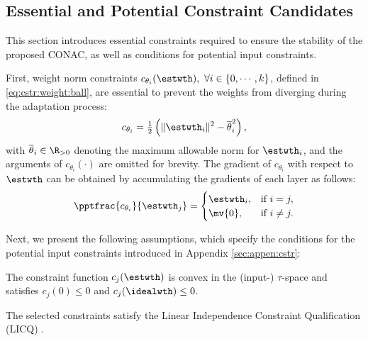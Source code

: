 \documentclass[letterpaper, journal]{IEEEtran}
\begin{document}
\subsection{Essential and Potential Constraint Candidates}\label{sec:sub:cstr} 

This section introduces essential constraints required to ensure the stability of the proposed CONAC, as well as conditions for potential input constraints.

First, weight norm constraints $c_{\theta_i}(\estwth),\ \forall i\in\{0,\cdots ,k\}$, defined in \eqref{eq:cstr:weight:ball}, are essential to prevent the weights from diverging during the adaptation process:
\begin{equation}
    c_{\theta_i}
    =
    \tfrac{1}{2}
    \left(
        \Vert \estwth_i\Vert^2 
        -
        \overline\theta_i^2 
    \right)    
    ,
    \label{eq:cstr:weight:ball}
\end{equation}
with $\overline\theta_i\in\R_{>0}$ denoting the maximum allowable norm for $\estwth_i$, and the arguments of $c_{\theta_i}(\cdot)$ are omitted for brevity.
The gradient of $c_{\theta_i}$ with respect to $\estwth$ can be obtained by accumulating the gradients of each layer as follows:
\begin{equation}
    \pptfrac{c_{\theta_i}}{\estwth_j} 
    =
    \begin{cases}
        \estwth_i,
        &
        \text{if } i=j,
        \\
        \mv{0},
        &
        \text{if } i\ne j
        .
    \end{cases} 
    \label{eq:cstr:weight:ball:grad}
\end{equation}

Next, we present the following assumptions, which specify the conditions for the potential input constraints introduced in Appendix \ref{sec:appen:cstr}:

\begin{assum}
    The constraint function $c_j(\estwth)$ is convex in the (input-) $\tau$-space and satisfies $c_j(0) \le 0$ and $c_j(\idealwth)\le 0$.
    \label{assum:convex}
\end{assum}

\begin{assum}
    The selected constraints satisfy the Linear Independence Constraint Qualification (LICQ) \cite[Chap.~12, Def.~12.1]{Nocedal:2006aa}.
    \label{assum:LICQ}
\end{assum}
\end{document}
